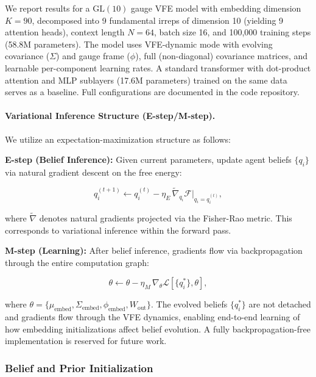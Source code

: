 \documentclass[twoside,11pt]{article}
\begin{document}
We report results for a $\mathrm{GL}(10)$ gauge VFE model with embedding dimension $K = 90$, decomposed into 9 fundamental irreps of dimension 10 (yielding 9 attention heads), context length $N = 64$, batch size 16, and 100{,}000 training steps (58.8M parameters). The model uses VFE-dynamic mode with evolving covariance ($\Sigma$) and gauge frame ($\phi$), full (non-diagonal) covariance matrices, and learnable per-component learning rates. A standard transformer with dot-product attention and MLP sublayers (17.6M parameters) trained on the same data serves as a baseline. Full configurations are documented in the code repository.


\paragraph{Variational Inference Structure (E-step/M-step).}
We utilize an expectation-maximization structure as follows:

\textbf{E-step (Belief Inference):} Given current parameters, update agent beliefs $\{q_i\}$ via natural gradient descent on the free energy:

\begin{equation}
q_i^{(t+1)} \leftarrow q_i^{(t)} - \eta_E \, \tilde{\nabla}_{q_i} \mathcal{F}\big|_{q_i = q_i^{(t)}},
\end{equation}

where $\tilde{\nabla}$ denotes natural gradients projected via the Fisher-Rao metric. This corresponds to variational inference within the forward pass.

\textbf{M-step (Learning):} After belief inference, gradients flow via backpropagation through the entire computation graph:

\begin{equation}
\theta \leftarrow \theta - \eta_M \, \nabla_{\theta} \mathcal{L}[\{q_i^*\}, \theta],
\end{equation}

where $\theta = \{\mu_{\text{embed}}, \Sigma_{\text{embed}}, \phi_{\text{embed}}, W_{\text{out}}\}$. The evolved beliefs $\{q_i^*\}$ are not detached and gradients flow through the VFE dynamics, enabling end-to-end learning of how embedding initializations affect belief evolution. A fully backpropagation-free implementation is reserved for future work.

\subsubsection{Belief and Prior Initialization}
\end{document}
